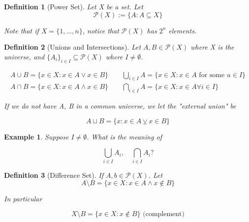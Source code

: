 \documentclass[11pt, oneside]{book}
\theoremstyle{break}
\newtheorem{defn}{Definition}[section]
\newtheorem{eg}{Example}[section]
\begin{document}
\begin{defn}[Power Set]
	Let X be a set. Let
	\begin{equation}
		\mathcal{P}(X) := \{A : A \subseteq X\}
	\end{equation}

	Note that if $X = \{1, ..., n\}$, notice that $\mathcal{P}(X)$ has $2^n$ elements.
\end{defn}

\begin{defn}[Unions and Intersections]
	Let $A, B \in \mathcal{P}(X)$ where X is the universe, and $\{A_i\}_{i \in I} \subseteq \mathcal{P}(X)$ where $I \neq \emptyset$.

	\begin{gather*}
		A \cup B = \{ x \in X : x \in A \lor x \in B \} \qquad \bigcup_{i \in I} A = \{x \in X : x \in A \text{ for some } u \in I\} \\
		A \cap B = \{ x \in X : x \in A \land x \in B \} \qquad \bigcap_{i \in I} A = \{ x \in X : x \in A \forall i \in I \}
	\end{gather*}

	If we do not have A, B in a common universe, we let the "external union" be

	\begin{equation}
		A \sqcup B = \{x : x \in A \veebar x \in B \}
	\end{equation}
\end{defn}

\begin{eg}
	Suppose $I \neq \emptyset$. What is the meaning of

	\begin{equation}
		\bigcup_{i \in I} A_i, \quad \bigcap_{i \in I} A_i?
	\end{equation}


\end{eg}

\begin{defn}[Difference Set]
	If $A, b \in \mathcal{P}(X)$. Let
	\begin{equation}
		A \setminus B = \{x \in X: x \in A \land x \notin B\}
	\end{equation}

	In particular

	\begin{equation}
		X \setminus B = \{x \in X: x \notin B\} \text{ (complement)}
	\end{equation}
\end{defn}
\end{document}
